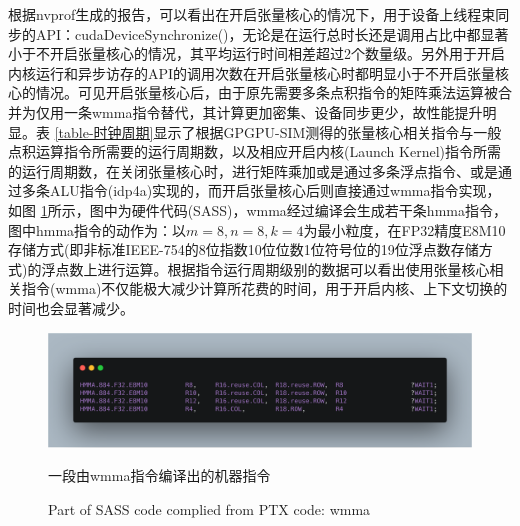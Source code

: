 \par 根据nvprof生成的报告，可以看出在开启张量核心的情况下，用于设备上线程束同步的API：cudaDeviceSynchronize()，无论是在运行总时长还是调用占比中都显著小于不开启张量核心的情况，其平均运行时间相差超过2个数量级。另外用于开启内核运行和异步访存的API的调用次数在开启张量核心时都明显小于不开启张量核心的情况。可见开启张量核心后，由于原先需要多条点积指令的矩阵乘法运算被合并为仅用一条wmma指令替代，其计算更加密集、设备同步更少，故性能提升明显。表 \ref{table-时钟周期}显示了根据GPGPU-SIM测得的张量核心相关指令与一般点积运算指令所需要的运行周期数，以及相应开启内核(Launch Kernel)指令所需的运行周期数，在关闭张量核心时，进行矩阵乘加或是通过多条浮点指令、或是通过多条ALU指令(idp4a)实现的，而开启张量核心后则直接通过wmma指令实现，如图 \ref{Fig.HMMASASS}所示，图中为硬件代码(SASS)，wmma经过编译会生成若干条hmma指令，图中hmma指令的动作为：以$ m=8,n=8,k=4 $为最小粒度，在FP32精度E8M10存储方式(即非标准IEEE-754的8位指数10位位数1位符号位的19位浮点数存储方式)的浮点数上进行运算。根据指令运行周期级别的数据可以看出使用张量核心相关指令(wmma)不仅能极大减少计算所花费的时间，用于开启内核、上下文切换的时间也会显著减少。
\begin{figure}
	\centering
	\includegraphics[width=15cm]{figures/HMMASASS.jpg}
	\renewcommand{\thefigure}{\arabic{section}-\arabic{figure} }
	\renewcommand{\figurename}{图}
	\caption{一段由wmma指令编译出的机器指令}
	\addtocounter{figure}{-1}
	\renewcommand{\thefigure}{\arabic{section}-\arabic{figure} }
	\renewcommand{\figurename}{Figure}
	\caption{Part of SASS code complied from PTX code: wmma}
	\label{Fig.HMMASASS}
\end{figure}
